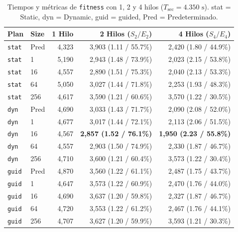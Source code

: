 \documentclass[12pt]{article}
\begin{document}
\begin{enumerate}
\begin{table}[htbp]
    \centering
    \small
    \begin{tabular}{llrrr}
        \toprule
        \textbf{Plan} & \textbf{Size} & \textbf{1 Hilo} & \textbf{2 Hilos ($S_2 / E_2$)} & \textbf{4 Hilos ($S_4 / E_4$)} \\
        \midrule
        \texttt{stat} & Pred & 4,323 & 3,903 (1.11 / 55.7\%) & 2,420 (1.80 / 44.9\%) \\
        \texttt{stat} & 1    & 5,190 & 2,943 (1.48 / 73.9\%) & 2,023 (2.15 / 53.8\%) \\
        \texttt{stat} & 16   & 4,557 & 2,890 (1.51 / 75.3\%) & 2,040 (2.13 / 53.3\%) \\
        \texttt{stat} & 64   & 5,050 & 3,027 (1.44 / 71.8\%) & 2,253 (1.93 / 48.3\%) \\
        \texttt{stat} & 256  & 4,617 & 3,590 (1.21 / 60.6\%) & 3,570 (1.22 / 30.5\%) \\
        \midrule
        \texttt{dyn} & Pred  & 4,690 & 3,033 (1.43 / 71.7\%) & 2,090 (2.08 / 52.0\%) \\
        \texttt{dyn} & 1     & 4,677 & 3,017 (1.44 / 72.1\%) & 2,113 (2.06 / 51.5\%) \\
        \texttt{dyn} & 16    & 4,567 & \textbf{2,857 (1.52 / 76.1\%)} & \textbf{1,950 (2.23 / 55.8\%)} \\
        \texttt{dyn} & 64    & 4,557 & 2,903 (1.50 / 74.9\%) & 2,330 (1.87 / 46.7\%) \\
        \texttt{dyn} & 256   & 4,710 & 3,600 (1.21 / 60.4\%) & 3,573 (1.22 / 30.4\%) \\
        \midrule
        \texttt{guid} & Pred & 4,870 & 3,560 (1.22 / 61.1\%) & 2,487 (1.75 / 43.7\%) \\
        \texttt{guid} & 1    & 4,647 & 3,573 (1.22 / 60.9\%) & 2,470 (1.76 / 44.0\%) \\
        \texttt{guid} & 16   & 4,690 & 3,637 (1.20 / 59.8\%) & 2,327 (1.87 / 46.7\%) \\
        \texttt{guid} & 64   & 4,720 & 3,553 (1.22 / 61.2\%) & 2,467 (1.76 / 44.1\%) \\
        \texttt{guid} & 256  & 4,707 & 3,627 (1.20 / 59.9\%) & 3,593 (1.21 / 30.3\%) \\
        \bottomrule
    \end{tabular}
    \caption{Tiempos y métricas de \texttt{fitness} con 1, 2 y 4 hilos ($T_{\text{sec}} = 4.350\text{ s}$). stat = Static, dyn = Dynamic, guid = guided, Pred = Predeterminado.}
    \label{tab:scheduling_fitness}
\end{table}


\end{enumerate}
\end{document}
